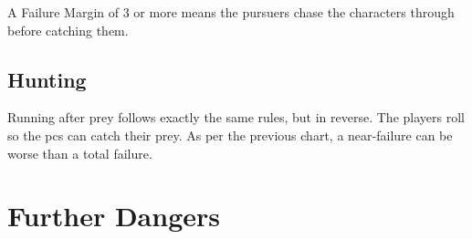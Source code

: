 \begin{multicols}{2}
A Failure Margin of 3 or more means the pursuers chase the characters through  before catching them.

\subsection{Hunting}

Running after prey follows exactly the same rules, but in reverse.
The players roll so the \glspl{pc} can catch their prey.
As per the previous chart, a near-failure can be worse than a total failure.

\end{multicols}

\huntchart

\section{Further Dangers}

